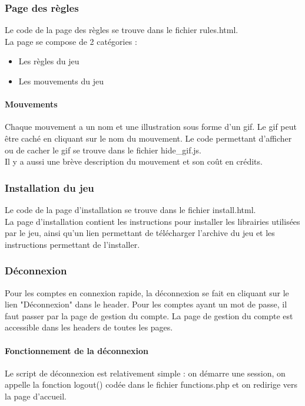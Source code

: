 \documentclass[12pt, openany]{article}
\begin{document}
	\subsubsection{Page des règles}
	Le code de la page des règles se trouve dans le fichier rules.html.\\
	La page se compose de 2 catégories :
	\begin{itemize}[label=$-$]
		\item Les règles du jeu\\
		\item Les mouvements du jeu\\
	\end{itemize}

	\paragraph{Mouvements}
	Chaque mouvement a un nom et une illustration sous forme d'un gif. Le gif peut être caché en cliquant sur le nom du mouvement. Le code permettant d'afficher ou de cacher le gif se trouve dans le fichier hide\_gif.js.\\
	Il y a aussi une brève description du mouvement et son coût en crédits.\\

	\subsubsection{Installation du jeu}
	Le code de la page d'installation se trouve dans le fichier install.html.\\
	La page d'installation contient les instructions pour installer les librairies utilisées par le jeu, ainsi qu'un lien permettant de télécharger l'archive du jeu et les instructions permettant de l'installer.\\

	\subsubsection{Déconnexion}
	Pour les comptes en connexion rapide, la déconnexion se fait en cliquant sur le lien "Déconnexion" dans le header. Pour les comptes ayant un mot de passe, il faut passer par la page de gestion du compte. La page de gestion du compte est accessible dans les headers de toutes les pages.\\

	\paragraph{Fonctionnement de la déconnexion}
	Le script de déconnexion est relativement simple : on démarre une session, on appelle la fonction logout() codée dans le fichier functions.php et on redirige vers la page d'accueil.\\
\end{document}
